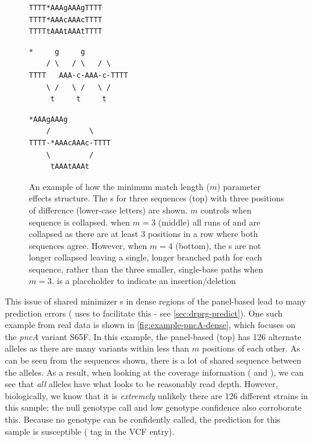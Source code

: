 \begin{figure}
\begin{Verbatim}[frame=single,framerule=0.5mm,label=Sequences,fontsize=\small,framesep=5mm]
TTTT*AAAgAAAgTTTT
TTTT*AAAcAAAcTTTT
TTTTtAAAtAAAtTTTT
\end{Verbatim}

\begin{Verbatim}[frame=single,framerule=0.5mm,label={$m=3$},fontsize=\small,framesep=5mm]
     *     g     g
    / \   / \   / \
TTTT   AAA-c-AAA-c-TTTT
    \ /   \ /   \ /
     t     t     t
\end{Verbatim}

\begin{Verbatim}[frame=single,framerule=0.5mm,label={$m=4$},fontsize=\small,framesep=5mm]
     *AAAgAAAg
    /         \
TTTT-*AAAcAAAc-TTTT
    \         /
     tAAAtAAAt
\end{Verbatim}
\caption{An example of how the \makeprg{} minimum match length ($m$) parameter effects \prg{} structure. The \prg{}s for three sequences (top) with three positions of difference (lower-case letters) are shown. $m$ controls when sequence is collapsed. when $m=3$ (middle) all runs of  and  are collapsed as there are at least 3 positions in a row where both sequences agree. However, when $m=4$ (bottom), the s are not longer collapsed leaving a single, longer branched path for each sequence, rather than the three smaller, single-base paths when $m=3$. \vrb{*} is a placeholder to indicate an insertion/deletion}
\label{fig:min-match-len-example}
\end{figure}

This issue of shared minimizer \kmer{}s in dense regions of the panel-based \prg{} lead to many \drprg{} prediction errors (\drprg{} uses \pandora{} to facilitate this - see \autoref{sec:drprg-predict}). One such example from real data is shown in \autoref{fig:example-pncA-dense}, which focuses on the \textit{pncA} variant S65F. In this example, the panel-based \prg{} (top) has 126 alternate alleles as there are many variants within less than $m$ positions of each other. As can be seen from the sequences shown, there is a lot of shared sequence between the alleles. As a result, when looking at the coverage information ( and ), we can see that \emph{all} alleles have what looks to be reasonably read depth. However, biologically, we know that it is \emph{extremely} unlikely there are 126 different strains in this sample; the null genotype call and low genotype confidence also corroborate this. Because no genotype can be confidently called, the prediction for this sample is susceptible ( tag in the VCF entry).

